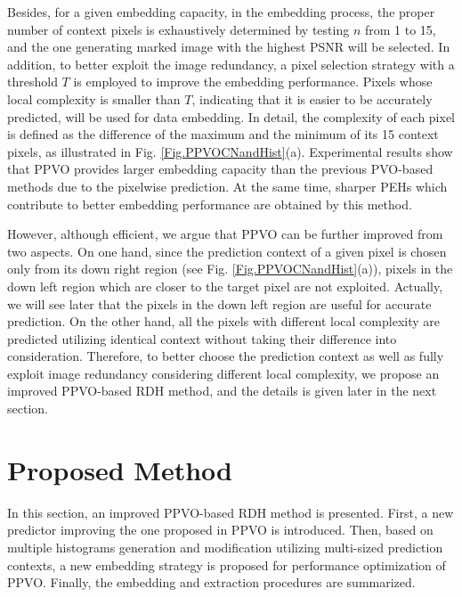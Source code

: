 \documentclass[review,3p,10pt,sort&compress]{elsarticle}
\begin{document}
Besides, for a given embedding capacity, in the embedding process, the proper number of context pixels is exhaustively determined by testing $n$ from 1 to 15, and the one generating marked image with the highest PSNR will be selected. In addition, to better exploit the image redundancy, a pixel selection strategy with a threshold $T$ is employed to improve the embedding performance. Pixels whose local complexity is smaller than $T$, indicating that it is easier to be accurately predicted, will be used for data embedding. In detail, the complexity of each pixel is defined as the difference of the maximum and the minimum of its 15 context pixels, as illustrated in Fig. \ref{Fig.PPVOCNandHist}(a). Experimental results show that PPVO provides larger embedding capacity than the previous PVO-based methods \cite{Li2013PVO,Peng2014IPVO} due to the pixelwise prediction. At the same time, sharper PEHs which contribute to better embedding performance are obtained by this method.

However, although efficient, we argue that PPVO can be further improved from two aspects. On one hand, since the prediction context of a given pixel is chosen only from its down right region (see Fig. \ref{Fig.PPVOCNandHist}(a)), pixels in the down left region which are closer to the target pixel are not exploited. Actually, we will see later that the pixels in the down left region are useful for accurate prediction. On the other hand, all the pixels with different local complexity are predicted utilizing identical context without taking their difference into consideration. Therefore, to better choose the prediction context as well as fully exploit image redundancy considering different local complexity, we propose an improved PPVO-based RDH method, and the details is given later in the next section.

\section{Proposed Method}\label{sec:3}

In this section, an improved PPVO-based RDH method is presented. First, a new predictor improving the one proposed in PPVO \cite{Qu2015PPVO} is introduced. Then, based on multiple histograms generation and modification utilizing multi-sized prediction contexts, a new embedding strategy is proposed for performance optimization of PPVO. Finally, the embedding and extraction procedures are summarized.
\end{document}
